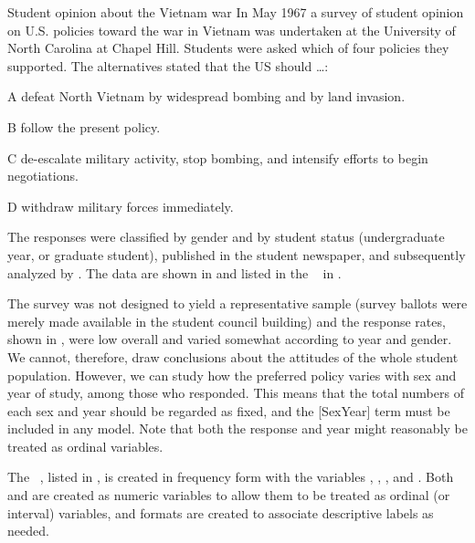 \begin{Example}[vietnam1]{Student opinion about the Vietnam war}
In May 1967 a survey of student opinion on U.S. policies toward the war in Vietnam was undertaken at the University of North Carolina at Chapel Hill.
Students were asked which of four policies they supported.  The alternatives stated that the US should \dots:
\begin{description*}
\item[A] defeat North Vietnam by widespread bombing and by land invasion.
\item[B] follow the present policy.
\item[C] de-escalate military activity, stop bombing, and intensify efforts to begin negotiations.
\item[D] withdraw military forces immediately.
\end{description*}
The responses were classified by gender and by student status (undergraduate year, or graduate student),  published in the student newspaper, and subsequently analyzed by \citet{Aitkin-etal:89}.  The data are shown in
 and listed in the \Dset\ 
in .


The survey was not designed to yield a representative sample
(survey ballots were merely made available in the student council building)
and the response rates, shown in , were low overall
and varied somewhat according to year and gender.
We cannot, therefore, draw conclusions about the attitudes of the whole student population.
However, we can study how the preferred policy varies with sex and year of study, among those who responded.
This means that the total numbers of each sex and year should be regarded
as fixed, and the [SexYear] term must be included in any model.
Note that both the response and year might reasonably be treated as ordinal
variables.

The \Dset\ , listed in , is created in frequency form
with the variables , , , and
.  Both  and  are created as
numeric variables to allow them to be treated as ordinal (or interval)
variables, and formats are created to associate descriptive labels
as needed.


\end{Example}
